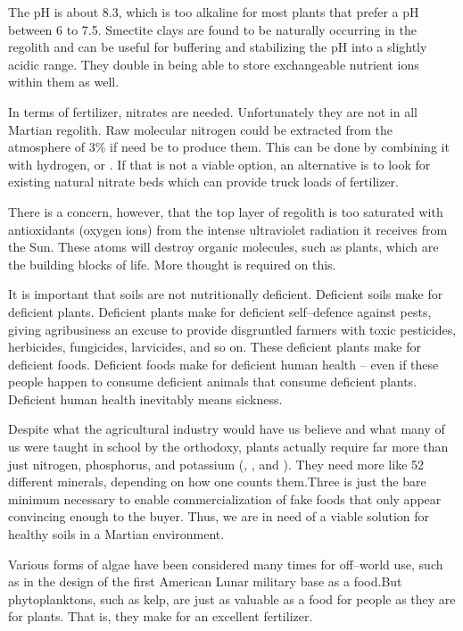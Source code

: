 The pH is about 8.3, which is too alkaline for most plants that prefer a pH between 6 to 7.5. Smectite clays are found to be naturally occurring in the regolith and can be useful for buffering and stabilizing the pH into a slightly acidic range. They double in being able to store exchangeable nutrient ions within them as well.

In terms of fertilizer, nitrates are needed. Unfortunately they are not in all Martian regolith. Raw molecular nitrogen could be extracted from the atmosphere of 3\% if need be to produce them. This can be done by combining it with hydrogen, or . If that is not a viable option, an alternative is to look for existing natural nitrate beds which can provide truck loads of fertilizer.

There is a concern, however, that the top layer of regolith is too saturated with antioxidants (oxygen ions) from the intense ultraviolet radiation it receives from the Sun. These atoms will destroy organic molecules, such as plants, which are the building blocks of life. More thought is required on this.

It is important that soils are not nutritionally deficient. Deficient soils make for deficient plants. Deficient plants make for deficient self--defence against pests, giving agribusiness an excuse to provide disgruntled farmers with toxic pesticides, herbicides, fungicides, larvicides, and so on. These deficient plants make for deficient foods. Deficient foods make for deficient human health  -- even if these people happen to consume deficient animals that consume deficient plants. Deficient human health inevitably means sickness.

Despite what the agricultural industry would have us believe and what many of us were taught in school by the orthodoxy, plants actually require far more than just nitrogen, phosphorus, and potassium (, , and ). They need more like 52 different minerals, depending on how one counts them. Three is just the bare minimum necessary to enable commercialization of fake foods that only appear convincing enough to the buyer. Thus, we are in need of a viable solution for healthy soils in a Martian environment.

Various forms of algae have been considered many times for off--world use, such as in the design of the first American Lunar military base as a food. But phytoplanktons, such as kelp, are just as valuable as a food for people as they are for plants. That is, they make for an excellent fertilizer.

